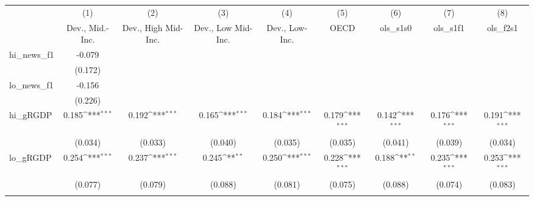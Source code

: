 {
\def\sym#1{\ifmmode^{#1}\else\(^{#1}\)\fi}
\begin{tabular}{l*{8}{c}}
\toprule
            &\multicolumn{1}{c}{(1)}&\multicolumn{1}{c}{(2)}&\multicolumn{1}{c}{(3)}&\multicolumn{1}{c}{(4)}&\multicolumn{1}{c}{(5)}&\multicolumn{1}{c}{(6)}&\multicolumn{1}{c}{(7)}&\multicolumn{1}{c}{(8)}\\
            &\multicolumn{1}{c}{Dev., Mid.-Inc.}&\multicolumn{1}{c}{Dev., High Mid-Inc.}&\multicolumn{1}{c}{Dev., Low Mid-Inc.}&\multicolumn{1}{c}{Dev., Low-Inc.}&\multicolumn{1}{c}{OECD}&\multicolumn{1}{c}{ols\_s1s0}&\multicolumn{1}{c}{ols\_s1f1}&\multicolumn{1}{c}{ols\_f2s1}\\
\midrule
hi\_news\_f1  &      -0.079         &                     &                     &                     &                     &                     &                     &                     \\
            &     (0.172)         &                     &                     &                     &                     &                     &                     &                     \\
\addlinespace
lo\_news\_f1  &      -0.156         &                     &                     &                     &                     &                     &                     &                     \\
            &     (0.226)         &                     &                     &                     &                     &                     &                     &                     \\
\addlinespace
hi\_gRGDP    &       0.185\sym{***}&       0.192\sym{***}&       0.165\sym{***}&       0.184\sym{***}&       0.179\sym{***}&       0.142\sym{***}&       0.176\sym{***}&       0.191\sym{***}\\
            &     (0.034)         &     (0.033)         &     (0.040)         &     (0.035)         &     (0.035)         &     (0.041)         &     (0.039)         &     (0.034)         \\
\addlinespace
lo\_gRGDP    &       0.254\sym{***}&       0.237\sym{***}&       0.245\sym{**} &       0.250\sym{***}&       0.228\sym{***}&       0.188\sym{**} &       0.235\sym{***}&       0.253\sym{***}\\
            &     (0.077)         &     (0.079)         &     (0.088)         &     (0.081)         &     (0.075)         &     (0.088)         &     (0.074)         &     (0.083)         \\
\addlinespace

\end{tabular}}
